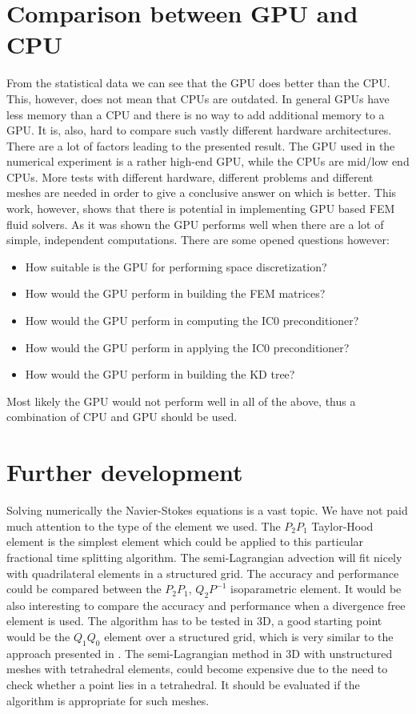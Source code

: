 \section{Comparison between GPU and CPU}
From the statistical data we can see that the GPU does better than the CPU. This, however, does not mean that CPUs are outdated. In general GPUs have less memory than a CPU and there is no way to add additional memory to a GPU. It is, also, hard to compare such vastly different hardware architectures. There are a lot of factors leading to the presented result. The GPU used in the numerical experiment is a rather high-end GPU, while the CPUs are mid/low end CPUs. More tests with different hardware, different problems and different meshes are needed in order to give a conclusive answer on which is better. This work, however, shows that there is potential in implementing GPU based FEM fluid solvers. As it was shown the GPU performs well when there are a lot of simple, independent computations. There are some opened questions however:
\begin{itemize}
	\item How suitable is the GPU for performing space discretization?
	\item How would the GPU perform in building the FEM matrices?
	\item How would the GPU perform in computing the IC0 preconditioner?
	\item How would the GPU perform in applying the IC0 preconditioner?
	\item How would the GPU perform in building the KD tree?
\end{itemize}
Most likely the GPU would not perform well in all of the above, thus a combination of CPU and GPU should be used.

\section{Further development}\label{ch:further-development}
Solving numerically the Navier-Stokes equations is a vast topic. We have not paid much attention to the type of the element we used. The $P_2P_1$ Taylor-Hood element is the simplest element which could be applied to this particular fractional time splitting algorithm. The semi-Lagrangian advection will fit nicely with quadrilateral elements in a structured grid. The accuracy and performance could be compared between the $P_2P_1$, $Q_2P^{-1}$ isoparametric element. It would be also interesting to compare the accuracy and performance when a divergence free element is used. The algorithm has to be tested in 3D, a good starting point would be the $Q_1Q_0$ element over a structured grid, which is very similar to the approach presented in \cite{Bridson}. The semi-Lagrangian method in 3D with unstructured meshes with tetrahedral elements, could become expensive due to the need to check whether a point lies in a tetrahedral. It should be evaluated if the algorithm is appropriate for such meshes.

